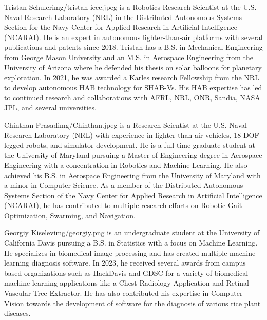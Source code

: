\thebiography

\begin{biographywithpic}
{Tristan Schuler}{img/tristan-ieee.jpeg}
is a Robotics Research Scientist at the U.S. Naval Research Laboratory (NRL) in the Distributed Autonomous Systems Section for the Navy Center for Applied Research in Artificial Intelligence (NCARAI). He
is an expert in autonomous lighter-than-air platforms with several publications and patents since 2018. Tristan has a B.S. in Mechanical Engineering from George Mason University and an M.S. in Aerospace Engineering from the University of Arizona where he defended his thesis on solar balloons for planetary exploration. In 2021, he was awarded a Karles research Fellowship from the NRL to develop autonomous HAB technology for SHAB-Vs. His HAB expertise has led to continued research and collaborations with AFRL, NRL, ONR, Sandia, NASA JPL, and several universities.
\end{biographywithpic} 

\begin{biographywithpic}
{Chinthan Prasad}{img/Chinthan.jpeg}
is a Research Scientist at the U.S. Naval Research Laboratory (NRL) with experience in lighter-than-air-vehicles, 18-DOF legged robots, and simulator development. He is a full-time graduate student at the University of Maryland pursuing a Master of Engineering degree in Aerospace Engineering with a concentration in Robotics and Machine Learning. He also achieved his B.S. in Aerospace Engineering from the University of Maryland with a minor in Computer Science. As a member of the Distributed Autonomous Systems Section of the Navy Center for Applied Research in Artificial Intelligence (NCARAI), he has contributed to multiple research efforts on Robotic Gait Optimization, Swarming, and Navigation. 
\end{biographywithpic}

\begin{biographywithpic}
{Georgiy Kiselev}{img/georgiy.png}
is an undergraduate student at the University of California Davis pursuing a B.S. in Statistics with a focus on Machine Learning. He specializes in biomedical image processing and has created multiple machine learning diagnosis software. In 2023, he received several awards from campus based organizations such as HackDavis and GDSC for a variety of biomedical machine learning applications like a Chest Radiology Application and Retinal Vascular Tree Extractor. He has also contributed his expertise in Computer Vision towards the development of software for the diagnosis of various rice plant diseases. 
\end{biographywithpic} 


